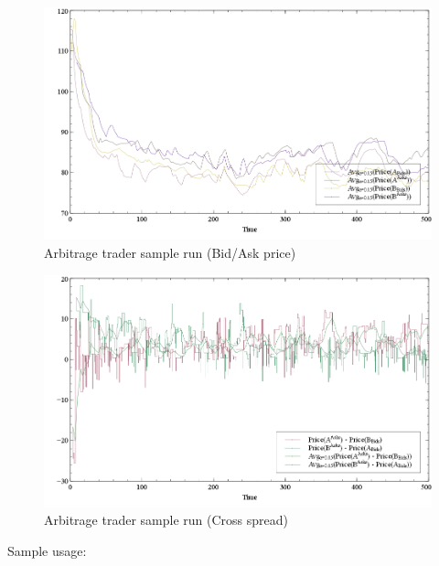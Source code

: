 \documentclass[a4paper,11pt]{article}
\begin{document}
\begin{figure}[htbp]
\centering
\includegraphics[width=1\linewidth]{Figures/Arbitrage_Bid_Ask_Spread.PNG}
\caption{Arbitrage trader sample run (Bid/Ask price)}
\label{fig:ArbBidAsk}
\end{figure}

\begin{figure}[htbp]
\centering
\includegraphics[width=1\linewidth]{Figures/Arbitrage_Cross_Spread.PNG}
\caption{Arbitrage trader sample run (Cross spread)}
\label{fig:ArbCross}
\end{figure}

Sample usage:
\end{document}
